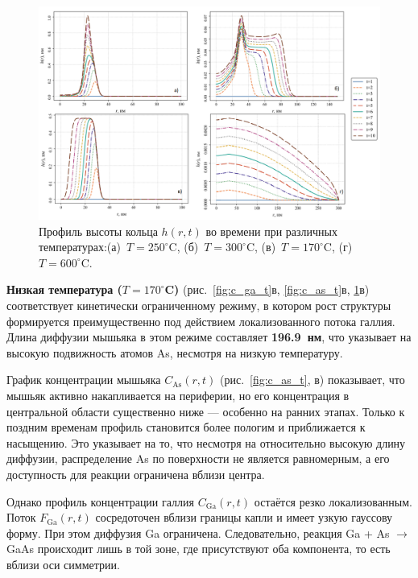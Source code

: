 \documentclass[14pt,oneside]{extarticle}
\begin{document}
\begin{figure}
    \begin{center}
    \includegraphics[width=18cm]{images/h-t.png}
    \caption{\label{fig:h_t} Профиль высоты кольца $h(r, t)$ во времени при различных температурах:(а)~$T=250^\circ$C, (б)~$T=300^\circ$C, (в)~$T=170^\circ$C, (г)~$T=600^\circ$C.}
    \end{center}
\end{figure}

\textbf{Низкая температура ($T = 170^\circ$C)} (рис.~\ref{fig:c_ga_t}в, \ref{fig:c_as_t}в, \ref{fig:h_t}в) соответствует кинетически ограниченному режиму, в котором рост структуры формируется преимущественно под действием локализованного потока галлия. Длина диффузии мышьяка в этом режиме составляет \textbf{196.9~нм}, что указывает на высокую подвижность атомов As, несмотря на низкую температуру.

График концентрации мышьяка $C_{\text{As}}(r, t)$ (рис.~\ref{fig:c_as_t}, в) показывает, что мышьяк активно накапливается на периферии, но его концентрация в центральной области существенно ниже — особенно на ранних этапах. Только к поздним временам профиль становится более пологим и приближается к насыщению. Это указывает на то, что несмотря на относительно высокую длину диффузии, распределение As по поверхности не является равномерным, а его доступность для реакции ограничена вблизи центра.

Однако профиль концентрации галлия $C_{\text{Ga}}(r, t)$ остаётся резко локализованным. Поток $F_{\text{Ga}}(r, t)$ сосредоточен вблизи границы капли и имеет узкую гауссову форму. При этом диффузия Ga ограничена. Следовательно, реакция Ga + As $\rightarrow$ GaAs происходит лишь в той зоне, где присутствуют оба компонента, то есть вблизи оси симметрии.
\end{document}
